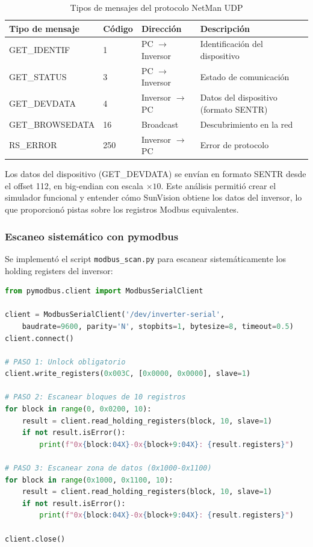 \documentclass[12pt,a4paper]{article}
\begin{document}
\begin{table}[H]
\centering
\begin{tabular}{llll}
\toprule
\textbf{Tipo de mensaje} & \textbf{C\'odigo} & \textbf{Direcci\'on} & \textbf{Descripci\'on} \\
\midrule
GET\_IDENTIF & 1 & PC $\rightarrow$ Inversor & Identificaci\'on del dispositivo \\
GET\_STATUS & 3 & PC $\rightarrow$ Inversor & Estado de comunicaci\'on \\
GET\_DEVDATA & 4 & Inversor $\rightarrow$ PC & Datos del dispositivo (formato SENTR) \\
GET\_BROWSEDATA & 16 & Broadcast & Descubrimiento en la red \\
RS\_ERROR & 250 & Inversor $\rightarrow$ PC & Error de protocolo \\
\bottomrule
\end{tabular}
\caption{Tipos de mensajes del protocolo NetMan UDP}
\end{table}

Los datos del dispositivo (GET\_DEVDATA) se env\'ian en formato SENTR desde el offset 112, en big-endian con escala $\times 10$. Este an\'alisis permiti\'o crear el simulador funcional y entender c\'omo SunVision obtiene los datos del inversor, lo que proporcion\'o pistas sobre los registros Modbus equivalentes.

\subsubsection{Escaneo sistem\'atico con pymodbus}

Se implement\'o el script \texttt{modbus\_scan.py} para escanear sistem\'aticamente los holding registers del inversor:

\begin{lstlisting}[language=Python, caption={Escaneo sistem\'atico de registros Modbus}]
from pymodbus.client import ModbusSerialClient

client = ModbusSerialClient('/dev/inverter-serial',
    baudrate=9600, parity='N', stopbits=1, bytesize=8, timeout=0.5)
client.connect()

# PASO 1: Unlock obligatorio
client.write_registers(0x003C, [0x0000, 0x0000], slave=1)

# PASO 2: Escanear bloques de 10 registros
for block in range(0, 0x0200, 10):
    result = client.read_holding_registers(block, 10, slave=1)
    if not result.isError():
        print(f"0x{block:04X}-0x{block+9:04X}: {result.registers}")

# PASO 3: Escanear zona de datos (0x1000-0x1100)
for block in range(0x1000, 0x1100, 10):
    result = client.read_holding_registers(block, 10, slave=1)
    if not result.isError():
        print(f"0x{block:04X}-0x{block+9:04X}: {result.registers}")

client.close()
\end{lstlisting}
\end{document}
